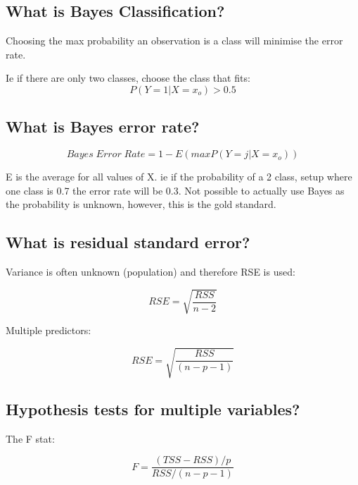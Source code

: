 \documentclass[11pt]{scrartcl} %
\begin{document}
\subsection{What is Bayes Classification?}

Choosing the max probability an observation is a class will minimise the error rate.

Ie if there are only two classes, choose the class that fits:
\begin{equation}
	P(Y=1|X=x_o) > 0.5
\end{equation}

\subsection{What is Bayes error rate?}

\begin{equation}
	Bayes\; Error\; Rate = 1 - E(maxP(Y=j|X=x_o))
\end{equation}

E is the average for all values of X. ie if the probability of a 2 class, setup where one class is 0.7 the error rate
will be 0.3. Not possible to actually use Bayes as the probability is unknown, however, this is the gold standard.

\subsection{What is residual standard error?}

Variance is often unknown (population) and therefore RSE is used:

\begin{equation}
	RSE = \sqrt{\frac{RSS}{n-2}}
\end{equation}

Multiple predictors:

\begin{equation}
	RSE = \sqrt{\frac{RSS}{(n-p-1)}}
\end{equation}

\subsection{Hypothesis tests for multiple variables?}

The F stat:

\begin{equation}
	F=\frac{(TSS-RSS)/p}{RSS/(n-p-1)}
\end{equation}
\end{document}
